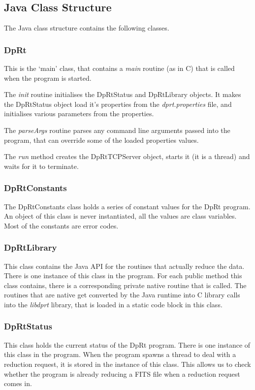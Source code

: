 \documentclass[10pt,a4paper]{article}
\begin{document}
\subsection{Java Class Structure}
The Java class structure contains the following classes.

\subsubsection{DpRt}
This is the `main' class, that contains a {\em main} routine (as in C) that is called when the program is started.

The {\em init} routine initialises the DpRtStatus and DpRtLibrary objects. It makes the DpRtStatus object
load it's properties from the {\em dprt.properties} file, and initialises various parameters from the properties.

The {\em parseArgs} routine parses any command line arguments passed into the program, that can override some
of the loaded properties values.

The {\em run} method creates the DpRtTCPServer object, starts it (it is a thread) and waits for it to terminate.

\subsubsection{DpRtConstants}
The DpRtConstants class holds a series of constant values for the DpRt program. An object of this class is never
instantiated, all the values are class variables. Most of the constants are error codes.

\subsubsection{DpRtLibrary}
This class contains the Java API for the routines that actually reduce the data. 
There is one instance of this class in the program. For each public method this
class contains, there is a corresponding private native routine that is called. The routines that are native 
get converted by the Java runtime into C library calls into the {\em libdprt} library, 
that is loaded in a static code block in this class.

\subsubsection{DpRtStatus}
This class holds the current status of the DpRt program. There is one instance of this class in the program.
When the program spawns a thread to deal with a 
reduction request, it is stored in the instance of this class. This allows us to check whether the 
program is already reducing a FITS file when a reduction request comes in.
\end{document}
